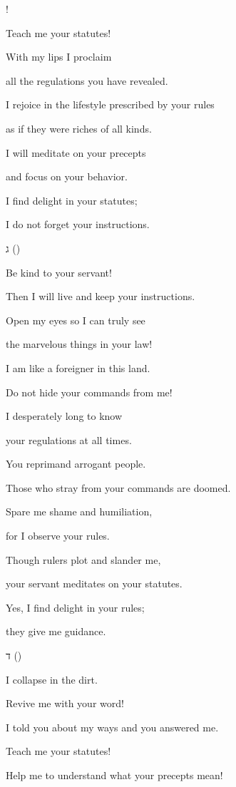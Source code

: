 {{}!
\par }{\Q Teach
me your statutes!
\par }{\Q {}With my lips
I proclaim
\par }{\Q all
the regulations
you have revealed.
\par }{\Q {}I rejoice
in the lifestyle
prescribed by
your rules
\par }{\Q as if they were riches of all
kinds.
\par }{\Q {}I will meditate
on your precepts
\par }{\Q and focus
on your behavior.
\par }{\Q {}I find delight
in your statutes;
\par }{\Q I do not
forget
your instructions.
\par }{\SH ג ({})
\par }{\Q {}Be kind to your servant!
\par }{\Q Then I will live and keep your instructions.
\par }{\Q {}Open
my eyes
so I can truly
see

\par }{\Q the marvelous
things in your law!
\par }{\Q {}I am
like a foreigner
in this land.
\par }{\Q Do not
hide
your commands
from me!
\par }{\Q {}I
desperately long
to know
\par }{\Q your regulations
at all
times.
\par }{\Q {}You reprimand
arrogant people.
\par }{\Q Those who stray
from your commands
are doomed.
\par }{\Q {}Spare
me shame
and humiliation,
\par }{\Q for
I observe
your rules.
\par }{\Q {}Though
rulers
plot and slander
me,

\par }{\Q your servant
meditates
on your statutes.
\par }{\Q {}Yes,
I find delight
in your rules;
\par }{\Q they give me guidance.
\par }{\SH ד ({})
\par }{\Q {}I collapse in the dirt.
\par }{\Q Revive me with your word!
\par }{\Q {}I told
you about my ways
and you answered
me.
\par }{\Q Teach
me your statutes!
\par }{\Q {}Help me to understand
what your precepts
mean!

}

